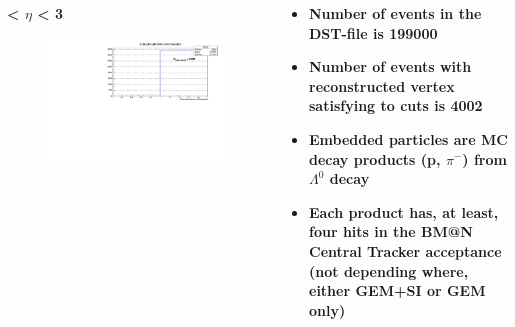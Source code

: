 \documentclass[dvipsnames] {beamer}
\begin{document}
\begin{frame}
\begin{columns}
           \begin{block}{\bf {} < $\eta$ < 3}
              \begin{figure}[H]
                 \includegraphics[width=1.\linewidth]{isEmbedded_eta_20_30.pdf}
               \end{figure}
           \end{block}
           \begin{block}{}
             \begin{itemize}
               \tiny
             \item \bf Number of events in the DST-file is {\color{red} 199000}
             \item \bf Number of events with reconstructed vertex satisfying to cuts is {\color{red} 4002}
             \item \bf Embedded particles are MC decay products (p, $\pi^{-}$) from $\Lambda^{0}$ decay
             \item \bf Each product has, at least, {\color{red} four} hits in the BM@N Central Tracker acceptance (not depending where, either GEM+SI or GEM only)
             \end{itemize}
           \end{block}         
         \end{columns}
         \end{frame}
\end{document}
